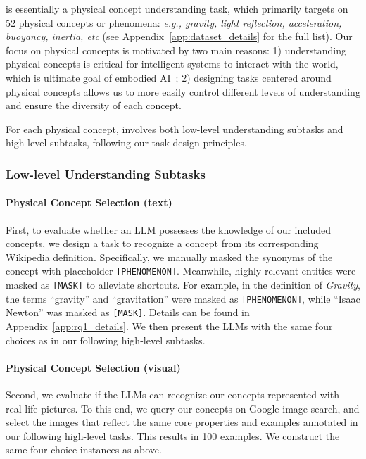 \datasetname is essentially a physical concept understanding task, which primarily targets on 52 physical concepts or phenomena: {\em e.g., gravity, light reflection, acceleration, buoyancy, inertia, etc} (see Appendix~\ref{app:dataset_details} for the full list).
Our focus on physical concepts is motivated by two main reasons:
1) understanding physical concepts is critical for intelligent systems to interact with the world, which is ultimate goal of embodied AI~\cite{savva2019habitat,duan2022survey,xiang2024language}; 
2) designing tasks centered around physical concepts allows us to more easily control different levels of understanding and ensure the diversity of each concept. 



For each physical concept, \datasetname involves both low-level understanding subtasks and high-level subtasks, following our task design principles. %






\subsubsection{Low-level Understanding Subtasks}
\label{sec: low-level}

\paragraph{Physical Concept Selection (text)} 
First, to evaluate whether an LLM possesses the knowledge of our included concepts,
we design a task to recognize a concept from its corresponding Wikipedia definition.
Specifically, we manually masked the synonyms of the concept with placeholder {\small \texttt{[PHENOMENON]}}. Meanwhile, highly relevant entities were masked as {\small \texttt{[MASK]}} to alleviate shortcuts. For example, in the definition of \emph{Gravity}, the terms ``gravity'' and ``gravitation'' were masked as {\small \texttt{[PHENOMENON]}}, while ``Isaac Newton'' was masked as {\small \texttt{[MASK]}}. 
Details can be found in Appendix~\ref{app:rq1_details}.
We then present the LLMs with the same four choices as in our following high-level subtasks.

\paragraph{Physical Concept Selection (visual)} 
Second, we evaluate if the LLMs can recognize our concepts represented with real-life pictures.
To this end, we query our concepts on Google image search, and select the images that reflect the same core properties and examples annotated in our following high-level tasks.
This results in 100 examples.
We construct the same four-choice instances as above.

